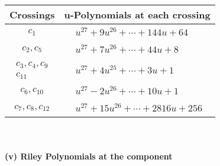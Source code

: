\documentclass[1p]{elsarticle_modified}
\theoremstyle{definition}
\begin{document}
\begin{tabular}{m{50pt}|m{274pt}}
Crossings & \hspace{64pt}u-Polynomials at each crossing \\
\hline $$\begin{aligned}c_{1}\end{aligned}$$&$\begin{aligned}
&u^{27}+9 u^{26}+\cdots+144 u+64
\end{aligned}$\\
\hline $$\begin{aligned}c_{2},c_{5}\end{aligned}$$&$\begin{aligned}
&u^{27}+7 u^{26}+\cdots+44 u+8
\end{aligned}$\\
\hline $$\begin{aligned}c_{3},c_{4},c_{9}\\c_{11}\end{aligned}$$&$\begin{aligned}
&u^{27}+4 u^{25}+\cdots+3 u+1
\end{aligned}$\\
\hline $$\begin{aligned}c_{6},c_{10}\end{aligned}$$&$\begin{aligned}
&u^{27}-2 u^{26}+\cdots+10 u+1
\end{aligned}$\\
\hline $$\begin{aligned}c_{7},c_{8},c_{12}\end{aligned}$$&$\begin{aligned}
&u^{27}+15 u^{26}+\cdots+2816 u+256
\end{aligned}$\\
\hline
\end{tabular}\\~\\
\newpage\renewcommand{\arraystretch}{1}
\flushleft \textbf{(v) Riley Polynomials at the component}\newline \\
\end{document}
